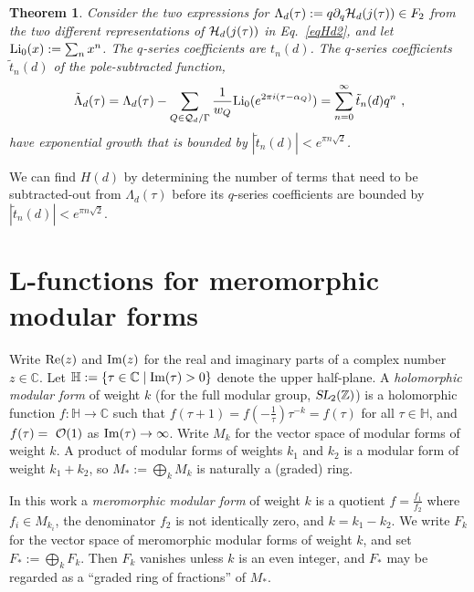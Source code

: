 \documentclass[11pt,a4paper]{article}
\newcommand{\G}{\Gamma}
\newcommand{\La}{\Lambda}
\newtheorem{thm}{Theorem}[section]
\def\C{\mathbb{C}}
\def\Z{\mathbb{Z}}
\def\d{\partial}
\newcommand{\SL}{\operatorname{\textsl{SL}}}	 	%
\newcommand{\HH}{{\mathbb H}}				%
\begin{document}
\begin{thm}\label{Thm3}
Consider the two expressions for $\Lambda_d(\tau) := q \d_q {\cal H}_d(j(\tau)) \in F_2$ from the two different representations of ${\cal H}_d(j(\tau))$ in Eq.~\eqref{eqHd2}, and let ${\rm Li}_0(x):= \sum_n x^n$. The $q$-series coefficients are $t_n(d)$. The $q$-series coefficients $\tilde{t}_n(d)$ of the pole-subtracted function,
\begin{align}
\tilde{\Lambda}_d(\tau) = \Lambda_d(\tau) - \sum_{Q \in {\cal Q}_d/\G} \frac{1}{w_Q}{\rm Li}_0(e^{2 \pi i (\tau-\alpha_Q)}) = \sum_{n = 0}^{\infty} \tilde{t}_n(d) q^n~, \label{eqThm3}
\end{align}
have exponential growth that is bounded by $|\tilde{t}_n(d)| < e^{\pi n\sqrt{2}}$. 
\end{thm}
We can find $H(d)$ by determining the number of terms that need to be subtracted-out from $\La_d(\tau)$ before its $q$-series coefficients are bounded by $|\tilde{t}_n(d)| < e^{\pi n \sqrt{2}}$.




\section{L-functions for meromorphic modular forms}\label{secLfunction}

Write ${\rm Re}(z)$ and ${\rm Im}(z)$ for the real and imaginary parts of a complex number $z\in \C$. Let $\HH:=\{\tau\in\C\mid {\rm Im}(\tau)>0\}$ denote the upper half-plane. A {\em holomorphic modular form} of weight $k$ (for the full modular group, $\SL_2(\Z)$) is a holomorphic function $f:\HH\to \C$ such that $f(\tau+1)=f(-\frac1\tau)\tau^{-k}=f(\tau)$ for all $\tau\in \HH$, and $f(\tau)={\cal~O}(1)$ as ${\rm Im}(\tau)\to \infty$. Write $M_k$ for the vector space of modular forms of weight $k$. A product of modular forms of weights $k_1$ and $k_2$ is a modular form of weight $k_1+k_2$, so $M_*:=\bigoplus_k  M_k$ is naturally a (graded) ring. 

In this work a {\em meromorphic modular form} of weight $k$ is a quotient $f=\frac{f_1}{f_2}$ where $f_i\in M_{k_i}$, the denominator $f_2$ is not identically zero, and $k=k_1-k_2$. We write $F_k$ for the vector space of meromorphic modular forms of weight $k$, and set $F_*:=\bigoplus_k F_k$. Then $F_k$ vanishes unless $k$ is an even integer, and $F_*$ may be regarded as a ``graded ring of fractions'' of $M_*$. 
\end{document}
